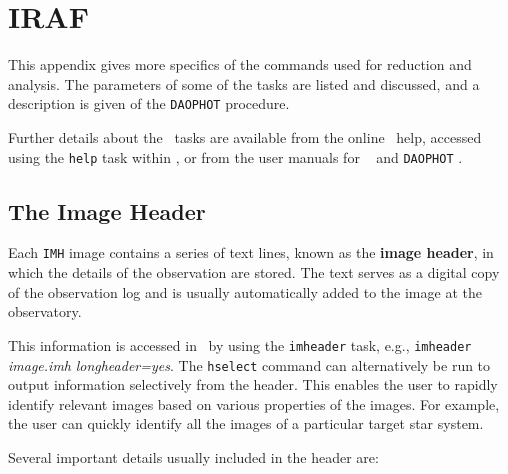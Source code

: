 
\chapter{IRAF}
\label{cha:IRAF}

This appendix gives more specifics of the commands used for reduction
and analysis. The parameters of some of the tasks are listed and
discussed, and a description is given of the \texttt{DAOPHOT}
procedure. %

\vspace{\myparskip}

Further details about the \iraf\ tasks are available from the
online \iraf\ help, accessed using the \texttt{help} task
within \iraf, or from the user manuals for \iraf\ %
\cite{Barnes:1993} %
and \texttt{DAOPHOT} %
\cite{Davis:1994}. %


\section{The Image Header}
\label{cha:IRAF:sec:Imhead}

Each \texttt{IMH} image contains a series of text lines, known as the
\textbf{image header}, %
in which the details of the observation are stored. The text serves as
a digital copy of the observation log and is usually automatically
added to the image at the observatory. %

\vspace{\myparskip}

This information is accessed in \iraf\ by using the
\texttt{imheader} task, e.g., \texttt{imheader} \textit{image.imh}
\textit{longheader=yes}. The \texttt{hselect} command can
alternatively be run to output information selectively from the
header. This enables the user to rapidly identify relevant images
based on various properties of the images. For example, the user can
quickly identify all the images of a particular target star system. %

\vspace{\myparskip}

Several important details usually included in the header are:

